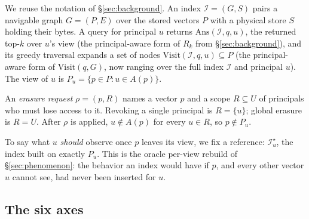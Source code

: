 \documentclass[sigconf, nonacm, review]{acmart}
\begin{document}
We reuse the notation of \S\ref{sec:background}. An index
$\mathcal{I}=(G,S)$ pairs a navigable graph $G=(P,E)$ over the stored
vectors $P$ with a physical store $S$ holding their bytes. A query for
principal $u$ returns $\mathrm{Ans}(\mathcal{I},q,u)$, the returned
top-$k$ over $u$'s view (the principal-aware form of $R_k$ from
\S\ref{sec:background}), and its greedy traversal expands a set of
nodes $\mathrm{Visit}(\mathcal{I},q,u)\subseteq P$ (the principal-aware form of
$\mathrm{Visit}(q,G)$, now ranging over the full index $\mathcal{I}$ and
principal $u$). The view of $u$ is
$P_u=\{p\in P: u\in A(p)\}$.

An \emph{erasure request} $\rho=(p,R)$ names a vector $p$ and a scope
$R\subseteq U$ of principals who must lose access to it. Revoking a single
principal is $R=\{u\}$; global erasure is $R=U$. After $\rho$ is
applied, $u\notin A(p)$ for every $u\in R$, so $p\notin P_u$.

To say what $u$ \emph{should} observe once $p$ leaves its view, we fix a
reference: $\mathcal{I}^\star_u$, the index built on exactly $P_u$. This is
the oracle per-view rebuild of \S\ref{sec:phenomenon}: the behavior an index
would have if $p$, and every other vector $u$ cannot see, had never been
inserted for $u$.

\subsection{The six axes}
\end{document}
